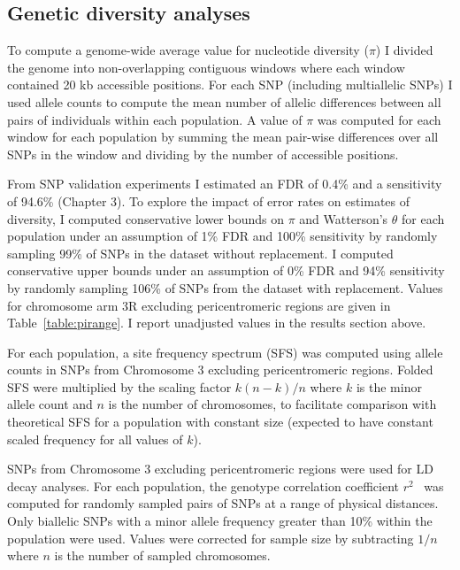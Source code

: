 \documentclass[a4paper,11pt,abstracton,hidelinks]{scrartcl}
\begin{document}
\subsection{Genetic diversity analyses}\label{subsec:methods-diversity}


To compute a genome-wide average value for nucleotide diversity ($\pi$) I divided the genome into non-overlapping contiguous windows where each window contained 20 kb accessible positions.
%
For each SNP (including multiallelic SNPs) I used allele counts to compute the mean number of allelic differences between all pairs of individuals within each population.
%
A value of $\pi$ was computed for each window for each population by summing the mean pair-wise differences over all SNPs in the window and dividing by the number of accessible positions.


From SNP validation experiments I estimated an FDR of 0.4\% and a sensitivity of 94.6\% (Chapter 3).
%
To explore the impact of error rates on estimates of diversity, I computed conservative lower bounds
on $\pi$ and Watterson's $\theta$ for each population under an assumption of 1\% FDR and 100\% sensitivity by randomly sampling 99\% of SNPs in the dataset without replacement.
%
I computed conservative upper bounds under an assumption of 0\% FDR and 94\% sensitivity by randomly sampling 106\% of SNPs from the dataset with replacement.
%
Values for chromosome arm 3R excluding pericentromeric regions are given in Table~\ref{table:pirange}.
%
I report unadjusted values in the results section above.


For each population, a site frequency spectrum (SFS) was computed using allele counts in SNPs from Chromosome 3 excluding pericentromeric regions.
%
Folded SFS were multiplied by the scaling factor $k (n - k) / n$ where $k$ is the minor allele count and $n$ is the number of chromosomes, to facilitate
comparison with theoretical SFS for a population with constant size (expected to have constant scaled frequency for all values of $k$).


SNPs from Chromosome 3 excluding pericentromeric regions were used for LD decay analyses.
%
For each population, the genotype correlation coefficient $r^2$~\parencite{Rogers2009} was computed for randomly sampled pairs of SNPs at a range of physical distances.
%
Only biallelic SNPs with a minor allele frequency greater than 10\% within the population were used.
%
Values were corrected for sample size by subtracting $1/n$ where $n$ is the number of sampled chromosomes.
\end{document}

